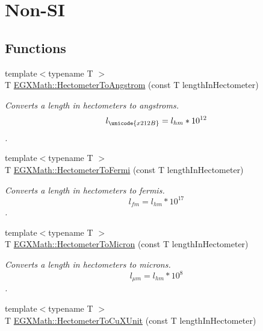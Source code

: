 \hypertarget{group___e_g_x_math-_conversions-_length_conversions-_s_i-_hectometer-_non-_s_i}{}\section{Non-\/\+SI}
\label{group___e_g_x_math-_conversions-_length_conversions-_s_i-_hectometer-_non-_s_i}
\subsection*{Functions}
\begin{DoxyCompactItemize}
\item 
{\footnotesize template$<$typename T $>$ }\\T \mbox{\hyperlink{group___e_g_x_math-_conversions-_length_conversions-_s_i-_hectometer-_non-_s_i_gad1296c0169aa8a99802a30b65a2ea516}{E\+G\+X\+Math\+::\+Hectometer\+To\+Angstrom}} (const T length\+In\+Hectometer)
\begin{DoxyCompactList}\small\item\em Converts a length in hectometers to angstroms. \[ l_{\unicode{x212B}}=l_{hm} * 10^{12} \]. \end{DoxyCompactList}\item 
{\footnotesize template$<$typename T $>$ }\\T \mbox{\hyperlink{group___e_g_x_math-_conversions-_length_conversions-_s_i-_hectometer-_non-_s_i_gabd26977f3d5ad9d0560afb10be63a598}{E\+G\+X\+Math\+::\+Hectometer\+To\+Fermi}} (const T length\+In\+Hectometer)
\begin{DoxyCompactList}\small\item\em Converts a length in hectometers to fermis. \[ l_{fm}=l_{hm} * 10^{17} \]. \end{DoxyCompactList}\item 
{\footnotesize template$<$typename T $>$ }\\T \mbox{\hyperlink{group___e_g_x_math-_conversions-_length_conversions-_s_i-_hectometer-_non-_s_i_ga997feaaeb91fc61c1d87c5d77fb7a665}{E\+G\+X\+Math\+::\+Hectometer\+To\+Micron}} (const T length\+In\+Hectometer)
\begin{DoxyCompactList}\small\item\em Converts a length in hectometers to microns. \[ l_{\mu m}=l_{hm} * 10^{8} \]. \end{DoxyCompactList}\item 
{\footnotesize template$<$typename T $>$ }\\T \mbox{\hyperlink{group___e_g_x_math-_conversions-_length_conversions-_s_i-_hectometer-_non-_s_i_ga5c1d570e3bec185a917f3987d45529be}{E\+G\+X\+Math\+::\+Hectometer\+To\+Cu\+X\+Unit}} (const T length\+In\+Hectometer)

\end{DoxyCompactItemize}
